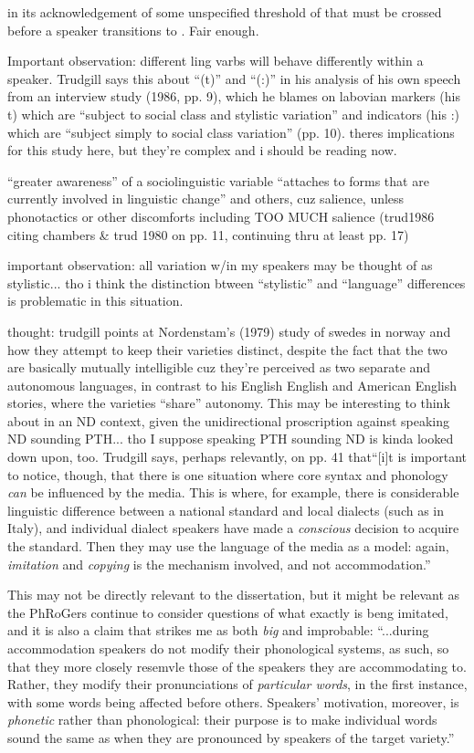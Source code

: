     in its acknowledgement of some unspecified threshold of \sta{} that must be crossed before a speaker transitions to \lta{}. Fair enough.
    
    Important observation: different ling varbs will behave differently within a speaker. Trudgill says this about ``(t)'' and ``(:)'' in his analysis of his own speech from an interview study (1986, pp. 9), which he blames on labovian markers (his t) which are ``subject to social class and stylistic variation'' and indicators (his :) which are ``subject simply to social class variation'' (pp. 10). theres implications for this study here, but they're complex and i should be reading now.
    
    ``greater awareness'' of a sociolinguistic variable ``attaches to forms that are currently involved in linguistic change'' and others, cuz salience, unless phonotactics or other discomforts including TOO MUCH salience (trud1986 citing chambers \& trud 1980 on pp. 11, continuing thru at least pp. 17)
    
    important observation: all variation w/in my speakers may be thought of as stylistic... tho i think the distinction btween ``stylistic'' and ``language'' differences is problematic in this situation.
    
    thought: trudgill points at Nordenstam's (1979) study of swedes in norway and how they attempt to keep their varieties distinct, despite the fact that the two are basically mutually intelligible cuz they're perceived as two separate and autonomous languages, in contrast to his English English and American English stories, where the varieties ``share'' autonomy. This may be interesting to think about in an ND context, given the unidirectional proscription against speaking ND sounding PTH... tho I suppose speaking PTH sounding ND is kinda looked down upon, too. Trudgill says, perhaps relevantly, on pp. 41 that``[i]t is important to notice, though, that there is one situation where core syntax and phonology \textit{can} be influenced by the media. This is where, for example, there is considerable linguistic difference between a national standard and local dialects (such as in Italy), and individual dialect speakers have made a \textit{conscious} decision to acquire the standard. Then they may use the language of the media as a model: again, \textit{imitation} and \textit{copying} is the mechanism involved, and not accommodation.''
    
    This may not be directly relevant to the dissertation, but it might be relevant as the PhRoGers continue to consider questions of what exactly is beng imitated, and it is also a claim that strikes me as both \emph{big} and improbable: ``...during accommodation speakers do not modify their phonological systems, as such, so that they more closely resemvle those of the speakers they are accommodating to. Rather, they modify their pronunciations of \textit{particular words}, in the first instance, with some words being affected before others. Speakers' motivation, moreover, is \textit{phonetic} rather than phonological: their purpose is to make individual words sound the same as when they are pronounced by speakers of the target variety.'' \cite[p. 58]{trudgill1986dialects}
    
